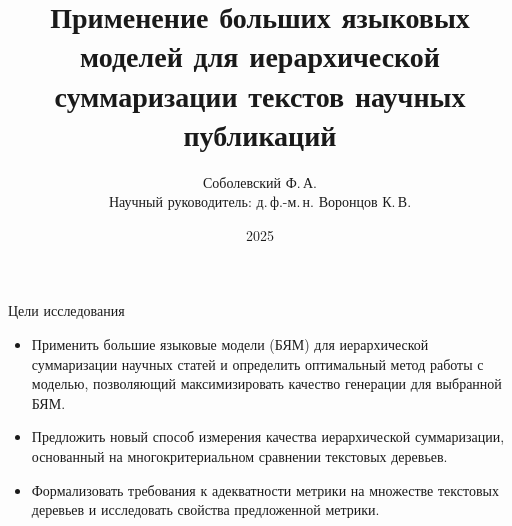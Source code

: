 \documentclass{beamer}
\title[\hbox to 56mm]{Применение больших языковых моделей для иерархической суммаризации текстов научных публикаций}
\author[Ф.\,А.~Соболевский]{Соболевский Ф.\,А. \\ Научный руководитель: д.\,ф.-м.\,н. Воронцов К.\,В.}
\institute{Московский физико-технический институт}
\date{2025}
\begin{document}

\begin{frame}
\thispagestyle{empty}
\maketitle
\end{frame}


\begin{frame}{Цели исследования}
\begin{itemize}
    \item Применить большие языковые модели (БЯМ) для иерархической суммаризации научных статей и определить оптимальный метод работы с моделью, позволяющий максимизировать качество генерации для выбранной БЯМ.
    \item Предложить новый способ измерения качества иерархической суммаризации, основанный на многокритериальном сравнении текстовых деревьев.
    \item Формализовать требования к адекватности метрики на множестве текстовых деревьев и исследовать свойства предложенной метрики.
\end{itemize}
\end{frame}

\end{document}
